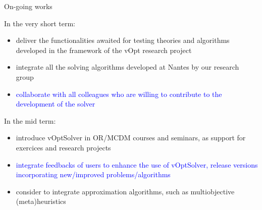 \documentclass[10pt,xcolor=dvipsnames]{beamer}
\newcommand{\blue}{\textcolor{blue}}
\begin{document}
\begin{frame}{On-going works}


In the very short term: 
\begin{itemize}
    \item deliver the functionalities awaited for testing theories and algorithms developed in the framework of the vOpt research project
             \smallskip
    \item integrate all the solving algorithms developed at Nantes by our research group    
             \smallskip
    \item \blue{collaborate with all colleagues who are willing to contribute to the  development of the solver}
 \end{itemize}    
\medskip

In the mid term: 
\begin{itemize}
    \item introduce vOptSolver in OR/MCDM courses and seminars, as support for exercices and research projects
              \smallskip
    \item \blue{integrate feedbacks of users to enhance the use of vOptSolver, release versions incorporating new/improved problems/algorithms}    
                  \smallskip
    \item consider to integrate approximation algorithms, such as multiobjective (meta)heuristics
 \end{itemize}  
    

\end{frame}

\end{document}
